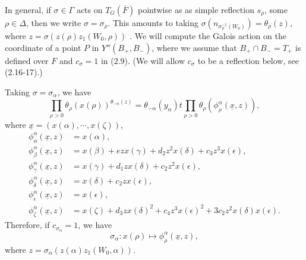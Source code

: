 \documentclass[12pt,letterpaper]{amsart}
\newcommand{\eps}{\epsilon}
\newcommand{\unx}{\underline{x}}
\begin{document}
In general, if $\sigma\in\Gamma$ acts on
$T_G(\overline{F})$ pointwise as as simple
reflection
$s_\rho$, some $\rho\in\Delta$, then we write $\sigma=\sigma_\rho$.
This amounts to taking $\sigma(n_{\sigma_T^{-1}(W_0)})=\theta_\rho (z)$,
where $z=\sigma(z(\rho)z_1(W_0,\rho))$ \cite[\S 3]{Ha89}. We will
compute the Galois action on the coordinate of a point $P$ in
$Y''(B_+,B_-)$, where we assume that $B_+\cap B_-=T_+$ is defined over
$F$ and $c_\sigma =1$ in (2.9). (We will allow $c_\sigma$ to
be a reflection below, see (2.16-17).)

Taking $\sigma=\sigma_\alpha$, we have
\[
\prod_{\rho >0}\theta_\rho(x(\rho))^{\theta_{-\alpha}(z)}
=\theta_{-\alpha}(y_\alpha)
t\prod_{\rho >0}\theta_\rho(\phi_\rho^\alpha(\unx,z)),
\tag{2.11}
\]
where $\unx =(x(\alpha),\cdots, x(\zeta))$,
\[
\begin{split}
\phi_\alpha^\alpha(\unx,z)
&=x(\alpha),\\
\phi_\beta^\alpha(\unx,z)
&=x(\beta)+ezx(\gamma)+d_2z^2x(\delta)+c_3z^3x(\eps),\\
\phi_\gamma^\alpha(\unx,z)
&=x(\gamma)+d_1zx(\delta)+c_2z^2x(\eps),\\
\phi_\delta^\alpha(\unx,z)
&=x(\delta)+c_2zx(\eps),\\
\phi_{\eps}^\alpha(\unx,z)
&=x(\eps),\\
\phi_\zeta^\alpha(\unx,z)
&=x(\zeta)+d_3zx(\delta)^2+c_4z^3x(\eps)^2+3c_2z^2x(\delta)x(\eps).
\end{split}
\]
Therefore, if $c_{\sigma_\alpha}=1$, we have
\[
\sigma_\alpha :x(\rho)\longmapsto \phi_\rho^\alpha(\unx,z),
\tag{2.12}
\]
where $z=\sigma_\alpha(z(\alpha)z_1(W_0,\alpha))$.
\end{document}
